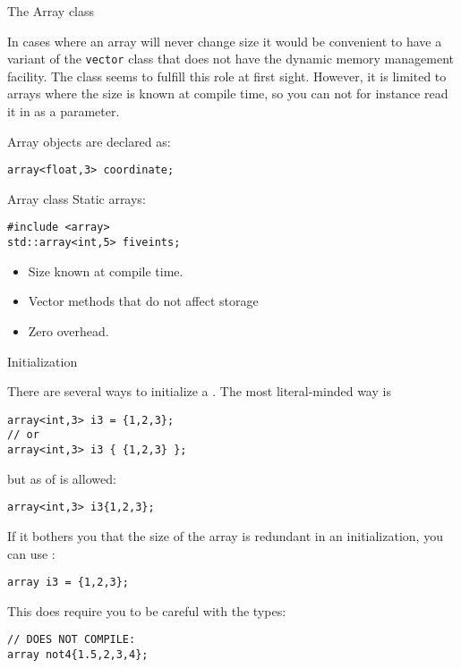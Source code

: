  {The Array class}
\label{sec:cpp-array}
\label{sec:stdarray}

In cases where an array will never change size it would be convenient
to have a variant of the \lstinline{vector} class that does not have
the dynamic memory management facility.
The  class seems to fulfill this role at first sight.
However, it
is limited to arrays where the size is known at compile time,
so you can not for instance read it in as a parameter.


Array objects are declared as:
\begin{lstlisting}
array<float,3> coordinate;
\end{lstlisting}


\begin{slide}{Array class}
\label{sl:array-class}
Static arrays:
\begin{lstlisting}
#include <array>
std::array<int,5> fiveints;
\end{lstlisting}
\begin{itemize}
\item Size known at compile time.
\item Vector methods that do not affect storage
\item Zero overhead.
\end{itemize}
\end{slide}

 {Initialization}

There are several ways to initialize a .
The most literal-minded way is
\begin{lstlisting}
array<int,3> i3 = {1,2,3};
// or
array<int,3> i3 { {1,2,3} };
\end{lstlisting}
but as of   is allowed:
\begin{lstlisting}
array<int,3> i3{1,2,3};  
\end{lstlisting}
If it bothers you that the size of the array is redundant in an initialization,
you can use  :
\begin{lstlisting}
array i3 = {1,2,3};  
\end{lstlisting}
This does require you to be careful with the types:
\begin{lstlisting}
// DOES NOT COMPILE:
array not4{1.5,2,3,4};
\end{lstlisting}

